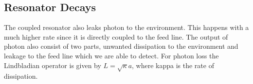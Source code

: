 



\subsection{Resonator Decays}\label{sec:resonator_decays}
The coupled resonator also leaks photon to the environment. This happens with a much higher rate since it is directly coupled to the feed line. The output of photon also consist of two parts, unwanted dissipation to the environment and leakage to the feed line which we are able to detect. For photon loss the Lindbladian operator is given by $L = \sqrt{\kappa}a$, where kappa is the rate of dissipation.

